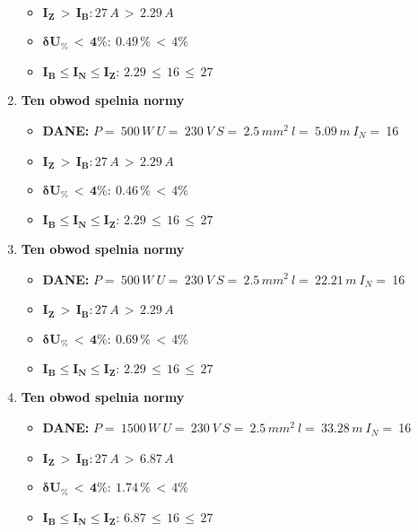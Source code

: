 \begin{enumerate}
\begin{itemize}
\item[\textcolor{Green}{\cmark}] $ \pmb{I_Z \, >  \, I_B: }27 \, A \, > \,2.29 \, A $
\item[\textcolor{Green}{\cmark}] $ \pmb{ \delta U_\% \, < \, 4\%:} \:0.49 \, \% \,< \, 4\% $
\item[\textcolor{Green}{\cmark}] $ \pmb{I_B \le I_N \le I_Z: } \, 2.29 \, \le \,16 \, \le \,27 $
\end{itemize}
\item \textcolor{Green}{\cmark} \textbf{Ten obwod spelnia normy} 
\begin{itemize}
\item[] \textbf{DANE: } \: $ P = \:500\, W\: U = \:230\: V\: S = \:2.5\, mm^2\: l = \:5.09\, m\: I_N= \: $16
\item[\textcolor{Green}{\cmark}] $ \pmb{I_Z \, >  \, I_B: }27 \, A \, > \,2.29 \, A $
\item[\textcolor{Green}{\cmark}] $ \pmb{ \delta U_\% \, < \, 4\%:} \:0.46 \, \% \,< \, 4\% $
\item[\textcolor{Green}{\cmark}] $ \pmb{I_B \le I_N \le I_Z: } \, 2.29 \, \le \,16 \, \le \,27 $
\end{itemize}
\item \textcolor{Green}{\cmark} \textbf{Ten obwod spelnia normy} 
\begin{itemize}
\item[] \textbf{DANE: } \: $ P = \:500\, W\: U = \:230\: V\: S = \:2.5\, mm^2\: l = \:22.21\, m\: I_N= \: $16
\item[\textcolor{Green}{\cmark}] $ \pmb{I_Z \, >  \, I_B: }27 \, A \, > \,2.29 \, A $
\item[\textcolor{Green}{\cmark}] $ \pmb{ \delta U_\% \, < \, 4\%:} \:0.69 \, \% \,< \, 4\% $
\item[\textcolor{Green}{\cmark}] $ \pmb{I_B \le I_N \le I_Z: } \, 2.29 \, \le \,16 \, \le \,27 $
\end{itemize}
\item \textcolor{Green}{\cmark} \textbf{Ten obwod spelnia normy} 
\begin{itemize}
\item[] \textbf{DANE: } \: $ P = \:1500\, W\: U = \:230\: V\: S = \:2.5\, mm^2\: l = \:33.28\, m\: I_N= \: $16
\item[\textcolor{Green}{\cmark}] $ \pmb{I_Z \, >  \, I_B: }27 \, A \, > \,6.87 \, A $
\item[\textcolor{Green}{\cmark}] $ \pmb{ \delta U_\% \, < \, 4\%:} \:1.74 \, \% \,< \, 4\% $
\item[\textcolor{Green}{\cmark}] $ \pmb{I_B \le I_N \le I_Z: } \, 6.87 \, \le \,16 \, \le \,27 $

\end{itemize}
\end{enumerate}
